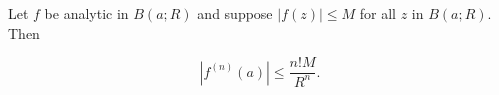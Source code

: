 Let $f$ be analytic in $B(a; R)$ and suppose $|f(z)| \leq M$ for all $z$ in $B(a; R)$. Then

$$|f^{(n)}(a)| \leq \frac{n!M}{R^n}.$$